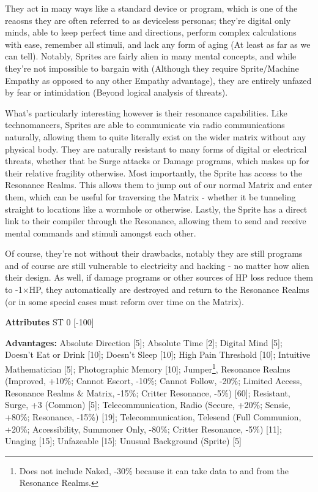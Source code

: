 \begin{multicols*}{3}
They act in many ways like a standard device or program, which is one of the reaosns they are often referred to as deviceless personas; they're digital only minds, able to keep perfect time and directions, perform complex calculations with ease, remember all stimuli, and lack any form of aging (At least as far as we can tell). Notably, Sprites are fairly alien in many mental concepts, and while they're not impossible to bargain with (Although they require Sprite/Machine Empathy as opposed to any other Empathy advantage), they are entirely unfazed by fear or intimidation (Beyond logical analysis of threats).

What's particularly interesting however is their resonance capabilities. Like technomancers, Sprites are able to communicate via radio communications naturally, allowing them to quite literally exist on the wider matrix without any physical body. They are naturally resistant to many forms of digital or electrical threats, whether that be Surge attacks or Damage programs, which makes up for their relative fragility otherwise. Most importantly, the Sprite has access to the Resonance Realms. This allows them to jump out of our normal Matrix and enter them,  which can be useful for traversing the Matrix - whether it be tunneling straight to locations like a wormhole or otherwise. Lastly, the Sprite has a direct link to their compiler through the Resonance, allowing them to send and receive mental commands and stimuli amongst each other.

Of course, they're not without their drawbacks, notably they are still programs and of course are still vulnerable to electricity and hacking - no matter how alien their design. As well, if damage programs or other sources of HP loss reduce them to -1$\times$HP, they automatically are destroyed and return to the Resonance Realms (or in some special cases must reform over time on the Matrix).

\textbf{Attributes}
ST 0 [-100]

\textbf{Advantages:}
Absolute Direction [5]; Absolute Time [2]; Digital Mind [5]; Doesn't Eat or Drink [10]; Doesn't Sleep [10]; High Pain Threshold [10]; Intuitive Mathematician [5]; Photographic Memory [10]; Jumper\footnote{Does not include Naked, -30\% because it can take data to and from the Resonance Realms.}, Resonance Realms (Improved, +10\%; Cannot Escort, -10\%; Cannot Follow, -20\%; Limited Access, Resonance Realms \& Matrix, -15\%; Critter Resonance, -5\%) [60];  Resistant, Surge, +3 (Common) [5]; Telecommunication, Radio (Secure, +20\%; Sensie, +80\%; Resonance, -15\%) [19]; Telecommunication, Telesend (Full Communion, +20\%; Accessibility, Summoner Only, -80\%; Critter Resonance, -5\%) [11]; Unaging [15]; Unfazeable [15]; Unusual Background (Sprite) [5]


\end{multicols*}
